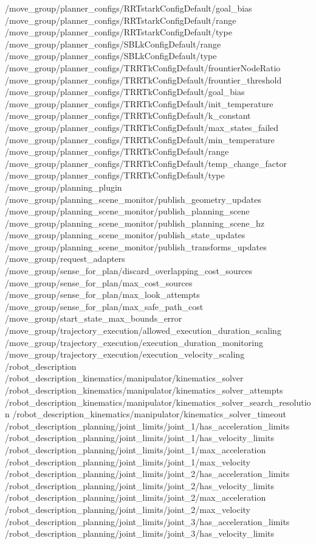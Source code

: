 \begin{DoxyVerb}
/move_group/planner_configs/RRTstarkConfigDefault/goal_bias
/move_group/planner_configs/RRTstarkConfigDefault/range
/move_group/planner_configs/RRTstarkConfigDefault/type
/move_group/planner_configs/SBLkConfigDefault/range
/move_group/planner_configs/SBLkConfigDefault/type
/move_group/planner_configs/TRRTkConfigDefault/frountierNodeRatio
/move_group/planner_configs/TRRTkConfigDefault/frountier_threshold
/move_group/planner_configs/TRRTkConfigDefault/goal_bias
/move_group/planner_configs/TRRTkConfigDefault/init_temperature
/move_group/planner_configs/TRRTkConfigDefault/k_constant
/move_group/planner_configs/TRRTkConfigDefault/max_states_failed
/move_group/planner_configs/TRRTkConfigDefault/min_temperature
/move_group/planner_configs/TRRTkConfigDefault/range
/move_group/planner_configs/TRRTkConfigDefault/temp_change_factor
/move_group/planner_configs/TRRTkConfigDefault/type
/move_group/planning_plugin
/move_group/planning_scene_monitor/publish_geometry_updates
/move_group/planning_scene_monitor/publish_planning_scene
/move_group/planning_scene_monitor/publish_planning_scene_hz
/move_group/planning_scene_monitor/publish_state_updates
/move_group/planning_scene_monitor/publish_transforms_updates
/move_group/request_adapters
/move_group/sense_for_plan/discard_overlapping_cost_sources
/move_group/sense_for_plan/max_cost_sources
/move_group/sense_for_plan/max_look_attempts
/move_group/sense_for_plan/max_safe_path_cost
/move_group/start_state_max_bounds_error
/move_group/trajectory_execution/allowed_execution_duration_scaling
/move_group/trajectory_execution/execution_duration_monitoring
/move_group/trajectory_execution/execution_velocity_scaling
/robot_description
/robot_description_kinematics/manipulator/kinematics_solver
/robot_description_kinematics/manipulator/kinematics_solver_attempts
/robot_description_kinematics/manipulator/kinematics_solver_search_resolution
/robot_description_kinematics/manipulator/kinematics_solver_timeout
/robot_description_planning/joint_limits/joint_1/has_acceleration_limits
/robot_description_planning/joint_limits/joint_1/has_velocity_limits
/robot_description_planning/joint_limits/joint_1/max_acceleration
/robot_description_planning/joint_limits/joint_1/max_velocity
/robot_description_planning/joint_limits/joint_2/has_acceleration_limits
/robot_description_planning/joint_limits/joint_2/has_velocity_limits
/robot_description_planning/joint_limits/joint_2/max_acceleration
/robot_description_planning/joint_limits/joint_2/max_velocity
/robot_description_planning/joint_limits/joint_3/has_acceleration_limits
/robot_description_planning/joint_limits/joint_3/has_velocity_limits

\end{DoxyVerb}
